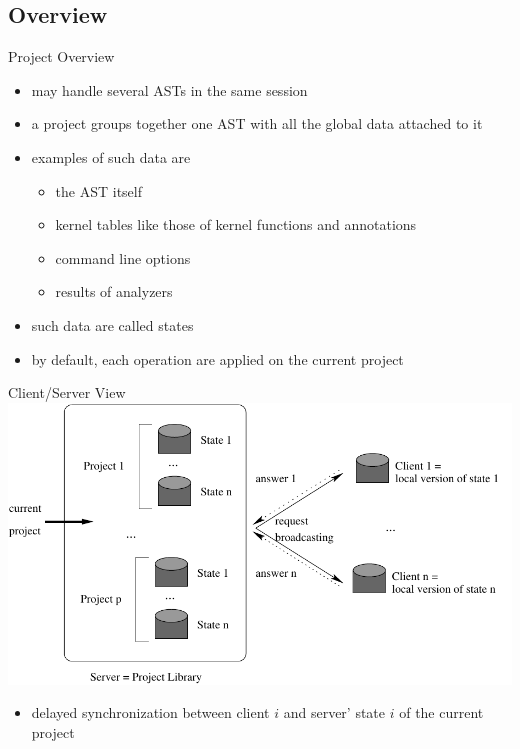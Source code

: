 \subsection{Overview}

\begin{frame}{Project Overview}

\begin{itemize}
\item \framac may handle several ASTs in the same session
\item a project groups together one AST with all the global data attached to it
\item examples of such data are
  \begin{itemize}
  \item the AST itself
  \item kernel tables like those of kernel functions and annotations
  \item command line options
  \item results of analyzers
  \end{itemize}
\item such data are called states
\item by default, each operation are applied on the current project
\end{itemize}

\end{frame}


\begin{frame}{Client/Server View}
  \includegraphics[scale=0.68]{mecanisme.pdf}

  \begin{itemize}
  \item delayed synchronization between client $i$ and server' state $i$
    of the current project    
  \end{itemize}
\end{frame}

